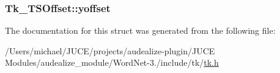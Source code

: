 \subsubsection[{\texorpdfstring{yoffset}{yoffset}}]{ Tk\+\_\+\+T\+S\+Offset\+::yoffset}\hypertarget{struct_tk___t_s_offset_a90258dbc306549c161476e4766b5ce0a}{}\label{struct_tk___t_s_offset_a90258dbc306549c161476e4766b5ce0a}


The documentation for this struct was generated from the following file\+:\begin{DoxyCompactItemize}
\item 
/\+Users/michael/\+J\+U\+C\+E/projects/audealize-\/plugin/\+J\+U\+C\+E Modules/audealize\+\_\+module/\+Word\+Net-\/3./include/tk/\hyperlink{tk_8h}{tk.\+h}\end{DoxyCompactItemize}
